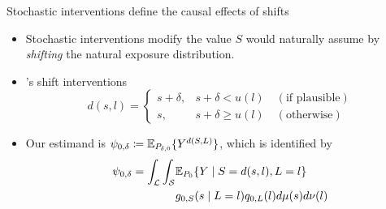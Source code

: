 \documentclass{beamer}
\begin{document}
\begin{frame}[c]{Stochastic interventions define the causal effects of shifts}

\begin{center}
\begin{itemize}
  \itemsep8pt
  \item Stochastic interventions modify the value $S$ would naturally assume by
    \textit{shifting} the natural exposure distribution.
  \item \cite{diaz2012population, diaz2018stochastic}'s shift
    interventions\footnotemark
     \begin{equation*}\label{shift_intervention}
       d(s, l) =
         \begin{cases}
           s + \delta, & s + \delta < u(l) \quad (\text{if plausible}) \\
           s, & s + \delta \geq u(l) \quad (\text{otherwise})
         \end{cases}
     \end{equation*}
  \item Our estimand is $\psi_{0,\delta} \coloneqq
    \mathbb{E}_{P_{\delta,0}}\{Y^{d(S,L)}\}$, which is identified by
    \begin{align*}\label{eqn:identification2012}
      \psi_{0,\delta} = \int_{\mathcal{L}} \int_{\mathcal{S}} &\mathbb{E}_{P_0}
        \{Y \mid S = d(s, l), L = l\} \\ &g_{0, S}(s \mid L = l)
        q_{0, L}(l) d\mu(s)d\nu(l)
    \end{align*}
\end{itemize}
\end{center}



\end{frame}
\end{document}
